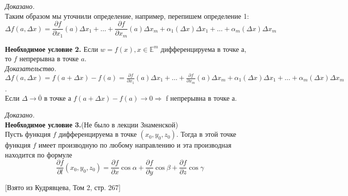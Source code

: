 \documentclass[a4paper,14pt]{article} %
\begin{document}
	 \textit{Доказано.}\\
	 
	 Таким образом мы уточнили определение, например, перепишем определение 1:
	 \[\Delta f(a, \Delta x) = \frac{\partial f}{\partial x_1}(a) \Delta x_1 + \ldots + \frac{\partial f}{\partial x_m}(a) \Delta x_m + \alpha_1(\Delta x) \Delta x_1 + \ldots + \alpha_m (\Delta x)\Delta x_m\]
	 
	 \textbf{Необходимое условие 2.} Если $w = f(x), x \in \mathds{E}^m$ дифференцируема в точке а, то $f$ непрерывна в точке $a$.\\
	 
	 \textit{Доказательство.}\\
	 $\Delta f(a, \Delta x) = f(a + \Delta x) - f(a) = \frac{\partial f}{\partial x_1}(a) \Delta x_1 + \ldots + \frac{\partial f}{\partial x_m}(a) \Delta x_m + \alpha_1(\Delta x) \Delta x_1 + \ldots + \alpha_m (\Delta x)\Delta x_m$.\\
	 Если $\Delta \to \bar0$ в точке а $f(a + \Delta x) - f(a) \to 0 \Rightarrow $ f непрерывна в точке а.
	 
	 \textit{Доказано.}\\
	 
	 \textbf{Необходимое условие 3.}(Не было в лекции Знаменской)\\
	 Пусть функция $f$ 	дифференцируема в  точке $(x_0, y_0, z_0)$. Тогда в этой точке функция $f$ имеет производную по любому направлению и эта производная находится по формуле 
	 \[\frac{\partial f}{\partial l}(x_0, y_0, z_0) = \frac{\partial f}{\partial x}\cos \alpha + \frac{\partial f}{\partial y}\cos\beta + \frac{\partial f}{\partial z}\cos \gamma\]
	 \begin{center}
	 		 [Взято из Кудрявцева, Том 2, стр. 267]
	 \end{center}
\end{document}
